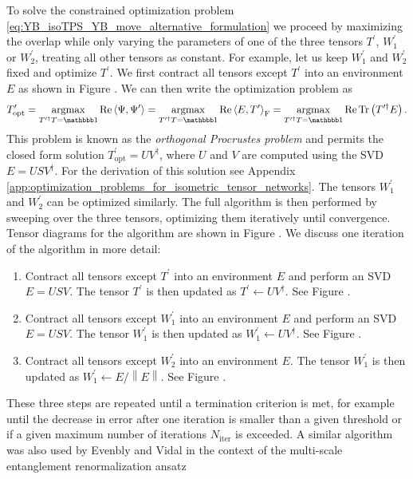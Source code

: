 To solve the constrained optimization problem \eqref{eq:YB_isoTPS_YB_move_alternative_formulation} we proceed by maximizing the overlap while only varying the parameters of one of the three tensors $T^\prime$, $W_1^\prime$ or $W_2^\prime$, treating all other tensors as constant. For example, let us keep $W_1^\prime$ and $W_2^\prime$ fixed and optimize $T^\prime$. We first contract all tensors except $T^\prime$ into an environment $E$ as shown in Figure . We can then write the optimization problem as
\begin{equation}
	T^\prime_\text{opt} = \underset{T^{\prime\dagger}T = \id}{\argmax} \Re\braket{\Psi,\Psi^\prime} = \underset{T^{\prime\dagger}T = \id}{\argmax}\Re\left\langle E, T^\prime\right\rangle_\text{F} = \underset{T^{\prime\dagger}T = \id}{\argmax}\Re\Tr\left(T^{\prime\dagger}E\right).
\end{equation}
This problem is known as the \textit{orthogonal Procrustes problem} and permits the closed form solution $T^\prime_\text{opt} = UV^\dagger$, where $U$ and $V$ are computed using the SVD $E = USV^\dagger$. For the derivation of this solution see Appendix \ref{app:optimization_problems_for_isometric_tensor_networks}. The tensors $W_1^\prime$ and $W_2^\prime$ can be optimized similarly. The full algorithm is then performed by sweeping over the three tensors, optimizing them iteratively until convergence. Tensor diagrams for the algorithm are shown in Figure . We discuss one iteration of the algorithm in more detail:
\begin{enumerate}
	\item Contract all tensors except $T^\prime$ into an environment $E$ and perform an SVD $E = USV$. The tensor $T^\prime$ is then updated as $T^\prime\leftarrow UV^\dagger$. See Figure .
	\item Contract all tensors except $W_1^\prime$ into an environment $E$ and perform an SVD $E = USV$. The tensor $W_1^\prime$ is then updated as $W_1^\prime\leftarrow UV^\dagger$. See Figure .
	\item Contract all tensors except $W_2^\prime$ into an environment $E$. The tensor $W_1^\prime$ is then updated as $W_1^\prime\leftarrow E/\left\lVert E\right\rVert$. See Figure .
\end{enumerate}
These three steps are repeated until a termination criterion is met, for example until the decrease in error after one iteration is smaller than a given threshold or if a given maximum number of iterations $N_\text{iter}$ is exceeded. A similar algorithm was also used by Evenbly and Vidal in the context of the multi-scale entanglement renormalization ansatz
